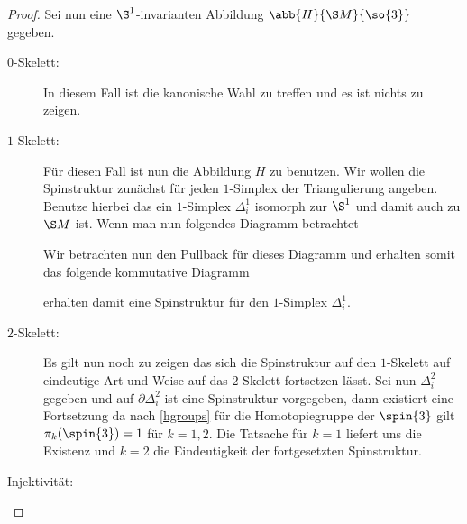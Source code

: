 \begin{Satz}
\begin{proof}
	Sei nun eine $\S^1$-invarianten Abbildung $\abb{H}{\S M}{\so{3}}$ gegeben.
	\begin{description}
		\item[$0$-Skelett:] In diesem Fall ist die kanonische Wahl zu treffen und es
			ist nichts zu zeigen.
		\item[$1$-Skelett:] Für diesen Fall ist nun die Abbildung $H$ zu benutzen. Wir wollen die Spinstruktur zunächst
		für jeden $1$-Simplex der Triangulierung angeben. 
		Benutze hierbei das ein $1$-Simplex $\Delta^1_i$ isomorph
		zur $\S^1$ und damit auch zu $\S M$ ist. Wenn man nun
		folgendes Diagramm betrachtet
		\begin{center}\end{center}
			Wir betrachten nun den Pullback für dieses Diagramm
			und erhalten somit das folgende kommutative Diagramm
		\begin{center}\end{center}
	 erhalten damit eine Spinstruktur für den $1$-Simplex
		$\Delta^1_i$. 
		\item[$2$-Skelett:] Es gilt nun noch zu zeigen das sich
		die Spinstruktur auf den $1$-Skelett auf eindeutige Art
		und Weise auf das $2$-Skelett fortsetzen lässt.
		Sei nun $\Delta^2_i$ gegeben und auf $\partial\Delta^2_i$
		ist eine Spinstruktur vorgegeben, dann existiert eine 
		Fortsetzung da nach \cref{hgroups} für die Homotopiegruppe
		der $\spin{3}$ gilt $\pi_k(\spin{3})=1$ für $k=1,2$.
		Die Tatsache für $k=1$ liefert uns die Existenz und $k=2$
		die Eindeutigkeit der fortgesetzten Spinstruktur.
		\item[Injektivität:] 
	\end{description}
\end{proof}
\end{Satz}




